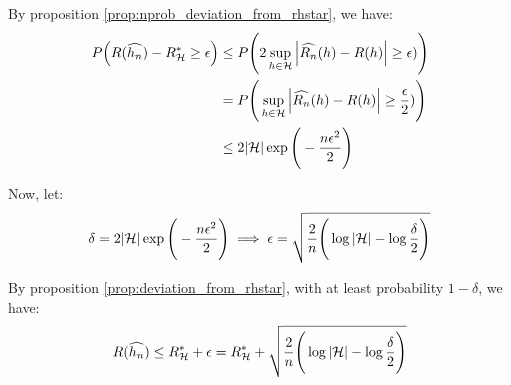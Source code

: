 \begin{proof*}
    By proposition \ref{prop:nprob_deviation_from_rhstar}, we have:
    \begin{align*}
        P\Big( 
            R(\widehat{h_n}) - R_\mathcal{H}^* \ge \epsilon
         \Big) 
        &\le
        P\Bigg( 2\sup_{h\in\mathcal{H}} \Big| \widehat{R_n}(h) - R(h) \Big| \ge \epsilon)  \Bigg) \\
        &= P\Bigg( \sup_{h\in\mathcal{H}} \Big| \widehat{R_n}(h) - R(h) \Big| \ge \frac{\epsilon}{2}) \Bigg) \\
        &\le 2|\mathcal{H}|\exp\Bigg( 
            -\frac{n\epsilon^2}{2}
         \Bigg)
    \end{align*}

    \noindent Now, let:
    \begin{align*}
        \delta = 2|\mathcal{H}|\exp\Bigg( 
            -\frac{n\epsilon^2}{2}
         \Bigg) \implies \epsilon = \sqrt{
            \frac{2}{n}\Bigg( \log|\mathcal{H}| - \log\frac{\delta}{2} \Bigg)
        }
    \end{align*}

    \noindent By proposition \ref{prop:deviation_from_rhstar}, with at least probability $1-\delta$, we have:
    \begin{align*}
        R(\widehat{h_n}) \le R_\mathcal{H}^* + \epsilon = R_\mathcal{H}^* + \sqrt{
            \frac{2}{n}\Bigg( \log|\mathcal{H}| - \log\frac{\delta}{2} \Bigg)
        }
    \end{align*}
\end{proof*}


